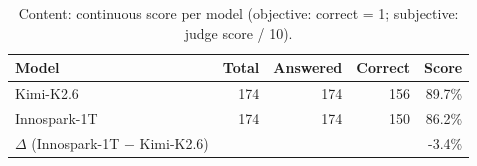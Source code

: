 \begin{table}[H]
  \centering
  \begin{tabular}{l r r r r}
    \toprule
    \textbf{Model} & \textbf{Total} & \textbf{Answered} & \textbf{Correct} & \textbf{Score} \\
    \midrule
    Kimi-K2.6 & 174 & 174 & 156 & 89.7\% \\
    Innospark-1T & 174 & 174 & 150 & 86.2\% \\
    \midrule
    $\Delta$ (Innospark-1T $-$ Kimi-K2.6) & & & & -3.4\% \\
    \bottomrule
  \end{tabular}
  \caption{Content: continuous score per model (objective: correct = 1; subjective: judge score / 10).}
  \label{tab:cat_content}
\end{table}